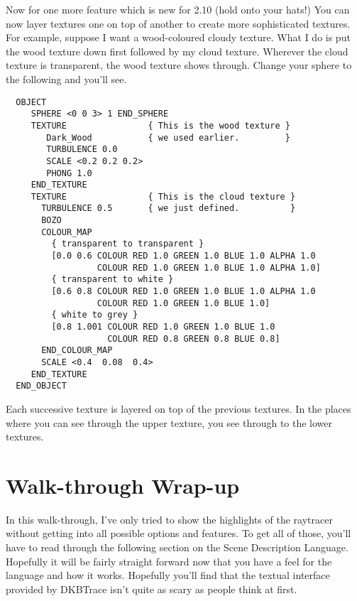 Now for one more feature which is new for 2.10 (hold onto your hats!)  You can
now layer textures one on top of another to create more sophisticated textures.
For example, suppose I want a wood-coloured cloudy texture.  What I do is put
the wood texture down first followed by my cloud texture.  Wherever the cloud
texture is transparent, the wood texture shows through.  Change your sphere to
the following and you'll see.
\begin{verbatim}
  OBJECT
     SPHERE <0 0 3> 1 END_SPHERE
     TEXTURE                { This is the wood texture }
        Dark_Wood           { we used earlier.         }
        TURBULENCE 0.0
        SCALE <0.2 0.2 0.2>
        PHONG 1.0
     END_TEXTURE
     TEXTURE                { This is the cloud texture }
       TURBULENCE 0.5       { we just defined.          }
       BOZO
       COLOUR_MAP
         { transparent to transparent }
         [0.0 0.6 COLOUR RED 1.0 GREEN 1.0 BLUE 1.0 ALPHA 1.0
                  COLOUR RED 1.0 GREEN 1.0 BLUE 1.0 ALPHA 1.0]
         { transparent to white }
         [0.6 0.8 COLOUR RED 1.0 GREEN 1.0 BLUE 1.0 ALPHA 1.0
                  COLOUR RED 1.0 GREEN 1.0 BLUE 1.0]
         { white to grey }
         [0.8 1.001 COLOUR RED 1.0 GREEN 1.0 BLUE 1.0
                    COLOUR RED 0.8 GREEN 0.8 BLUE 0.8]
       END_COLOUR_MAP
       SCALE <0.4  0.08  0.4>
     END_TEXTURE
  END_OBJECT
\end{verbatim}
Each successive texture is layered on top of the previous textures.  In the
places where you can see through the upper texture, you see through to the
lower textures.

\section{Walk-through Wrap-up}

In this walk-through, I've only tried to show the highlights of the raytracer
without getting into all possible options and features.  To get all of those,
you'll have to read through the following section on the Scene Description
Language.  Hopefully it will be fairly straight forward now that you have a
feel for the language and how it works.  Hopefully you'll find that the
textual interface provided by DKBTrace isn't quite as scary as people think at
first.
